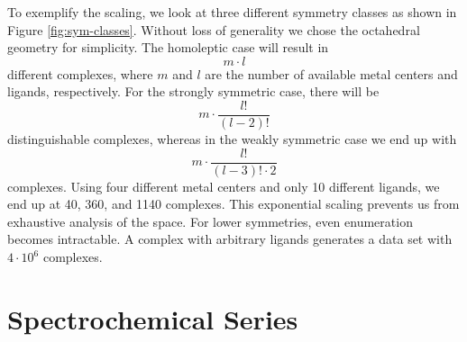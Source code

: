 \documentclass{article}
\begin{document}
To exemplify the scaling, we look at three different symmetry classes as shown in Figure \ref{fig:sym-classes}. Without loss of generality we chose the octahedral geometry for simplicity. The homoleptic case will result in 
\begin{equation}
	m \cdot l
\end{equation}
different complexes, where $m$ and $l$ are the number of available metal centers and ligands, respectively. For the strongly symmetric case, there will be
\begin{equation}
	m \cdot \frac{l!}{(l-2)!}
\end{equation}
distinguishable complexes, whereas in the weakly symmetric case we end up with 
\begin{equation}
	m \cdot  \frac{l!}{(l-3)! \cdot  2}
\end{equation}
complexes. Using four different metal centers and only 10 different ligands, we end up at 40, 360, and 1140 complexes. This exponential scaling prevents us from exhaustive analysis of the space. For lower symmetries, even enumeration becomes intractable. A complex with arbitrary ligands generates a data set with $4 \cdot 10^6$ complexes. 

\section{Spectrochemical Series}
\cite{tsuchida1938, ballhausen1963, griffith1957}


\end{document}
